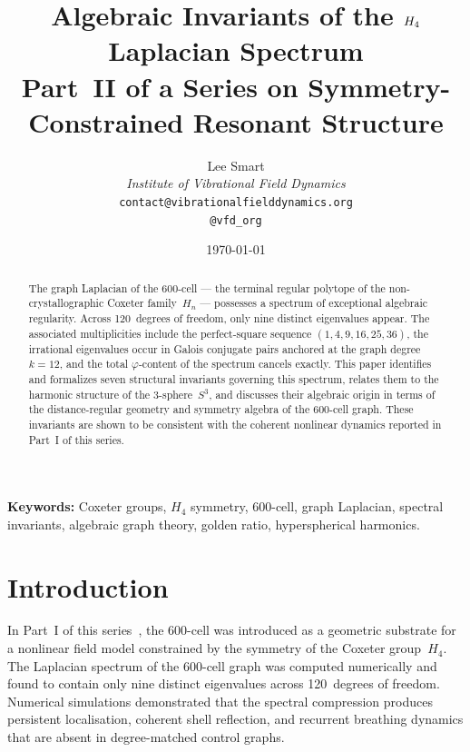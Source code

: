 \documentclass[12pt,a4paper]{article}
\title{%
  \textbf{Algebraic Invariants of the $\Hfour$ Laplacian Spectrum}\\[6pt]
  \large Part~II of a Series on Symmetry-Constrained Resonant Structure%
}
\author{%
  Lee Smart\\[4pt]
  \textit{Institute of Vibrational Field Dynamics}\\[2pt]
  \texttt{contact@vibrationalfielddynamics.org}\\[2pt]
  \texttt{@vfd\_org}%
}
\date{\today}
\newcommand{\Hfour}{H_4}
\newcommand{\vphi}{\varphi}
\begin{document}
\maketitle
\thispagestyle{empty}

\begin{abstract}
The graph Laplacian of the 600-cell --- the terminal regular polytope
of the non-crystallographic Coxeter family~$H_n$ --- possesses a
spectrum of exceptional algebraic regularity.  Across 120~degrees of
freedom, only nine distinct eigenvalues appear.  The associated
multiplicities include the perfect-square sequence
$(1,4,9,16,25,36)$, the irrational eigenvalues occur in Galois
conjugate pairs anchored at the graph degree~$k=12$, and the total
$\vphi$-content of the spectrum cancels exactly.  This paper
identifies and formalizes seven structural invariants governing this
spectrum, relates them to the harmonic structure of the 3-sphere~$S^3$,
and discusses their algebraic origin in terms of the distance-regular
geometry and symmetry algebra of the 600-cell graph.  These invariants
are shown to be consistent with the coherent nonlinear dynamics
reported in Part~I of this series.
\end{abstract}

\vspace{1em}
\noindent\textbf{Keywords:}
Coxeter groups, $\Hfour$ symmetry, 600-cell, graph Laplacian,
spectral invariants, algebraic graph theory, golden ratio,
hyperspherical harmonics.

\newpage
\tableofcontents
\newpage


\section{Introduction}\label{sec:intro}

In Part~I of this series~\cite{paper1}, the 600-cell was introduced as a
geometric substrate for a nonlinear field model constrained by the
symmetry of the Coxeter group~$\Hfour$.  The Laplacian spectrum of the
600-cell graph was computed numerically and found to contain only nine
distinct eigenvalues across 120~degrees of freedom.  Numerical
simulations demonstrated that the spectral compression produces
persistent localisation, coherent shell reflection, and recurrent
breathing dynamics that are absent in degree-matched control graphs.
\end{document}
